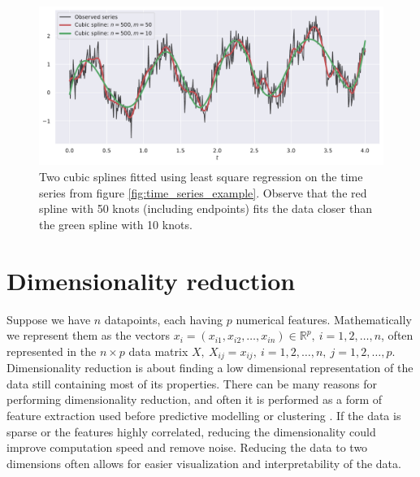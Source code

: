 \documentclass[a4paper, 10pt]{memoir}
\theoremstyle{plain}
\theoremstyle{definition}
\theoremstyle{remark}
\begin{document}
\begin{figure}[tb]
        \centering
        \includegraphics[width=\linewidth]{./code/figures/cubic_splines.pdf}
        \caption{Two cubic splines fitted using least square regression on the time series from figure \ref{fig:time_series_example}.
        Observe that the red spline with 50 knots (including endpoints) fits the data closer than the green spline with 10 knots.}
        \label{fig:cubic_splines}
\end{figure}




\section{Dimensionality reduction}
Suppose we have $n$ datapoints, each having $p$ numerical features. 
Mathematically we represent them as the vectors $x_i = (x_{i1}, x_{i2}, \hdots, x_{in} ) \in \mathbb{R}^p, \ i = 1, 2, \hdots, n$, often represented in the $n \times p$ data matrix $X, \ X_{ij} = x_{ij}, \ i = 1, 2, \hdots, n, \ j = 1, 2, \hdots, p$.
Dimensionality reduction is about finding a low dimensional representation of the data still containing most of its properties.
There can be many reasons for performing dimensionality reduction, and often it is performed as a form of feature extraction used before predictive modelling or clustering \cite{hastie}.
If the data is sparse or the features highly correlated, reducing the dimensionality could improve computation speed and remove noise.
Reducing the data to two dimensions often allows for easier visualization and interpretability of the data.
\end{document}

